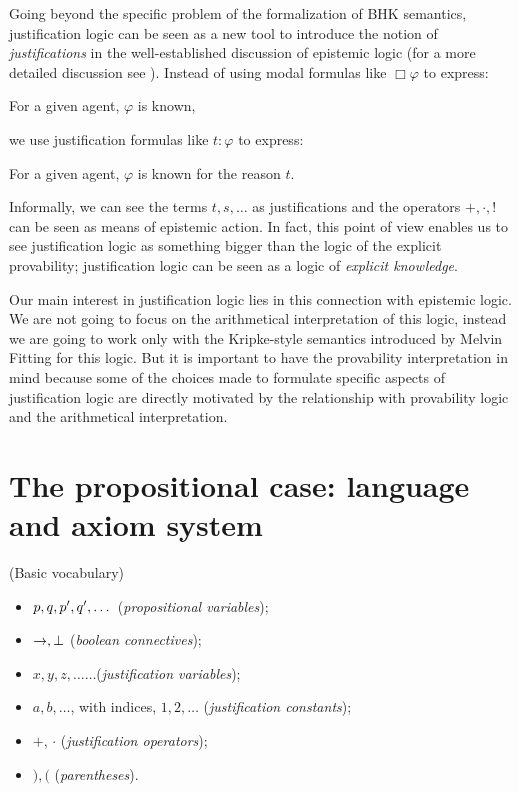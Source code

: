 \qquad Going beyond the specific problem of the formalization of BHK semantics, justification logic can be seen as a new tool to introduce the notion of \textit{justifications} in the well-established discussion of epistemic logic (for a more detailed discussion see \cite{Artemov08}). Instead of using modal formulas like $\Box \varphi$ to express:

\begin{center}
For a given agent, $\varphi$ is known,	
\end{center}  
we use justification formulas like $t$$:$$\varphi$ to express:

\begin{center}
For a given agent, $\varphi$ is known for the reason $t$.	
\end{center}  

\qquad Informally, we can see the terms $t, s, \dots$ as justifications and the operators $+, \cdot, !$ can be seen as means of epistemic action. In fact, this point of view enables us to see justification logic as something bigger than the logic of the explicit provability; justification logic can be seen as a logic of \textit{explicit knowledge}.

\qquad Our main interest in justification logic lies in this connection with epistemic logic. We are not going to focus on the arithmetical interpretation of this logic, instead we are going to work only with the Kripke-style semantics introduced by Melvin Fitting for this logic. But it is important to have the provability interpretation in mind because some of the choices made to formulate specific aspects of justification logic are directly motivated by the relationship with provability logic and the arithmetical interpretation. 

\section{The propositional case: language and axiom system}

\begin{defn} (Basic vocabulary)	
	\begin{itemize} 
		\item $p, q, p^{\prime}, q^{\prime}, \dots$ (\textit{propositional variables});
		\item $\rightarrow, \bot$ (\textit{boolean connectives});
		\item $x,y,z, \dots \dots$(\textit{justification variables});
		\item $a, b, \dots$, with indices, $1, 2, \dots$ (\textit{justification constants});
		\item $+$, $\cdot$ (\textit{justification operators});
		\item $),($ (\textit{parentheses}).
	\end{itemize}
\end{defn}

